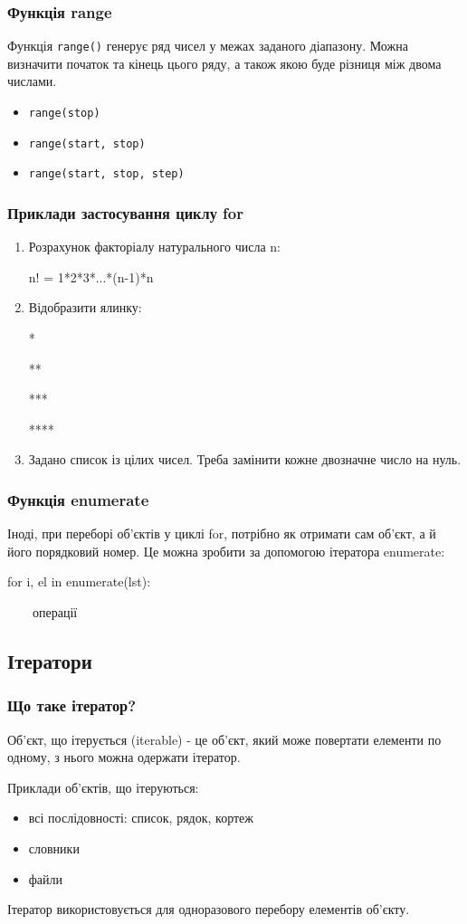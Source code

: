 \begin{frame}
\frametitle{Функція range}
Функція \texttt{range()} генерує ряд чисел у межах заданого діапазону. Можна визначити початок та кінець цього ряду, а також якою буде різниця між двома числами.

\begin{itemize}
  \item \texttt{range(stop)}
  \item \texttt{range(start, stop)}
  \item \texttt{range(start, stop, step)}
\end{itemize}
\end{frame}

\begin{frame}
\frametitle{Приклади застосування циклу for}
\begin{enumerate}
  \item 
  Розрахунок факторіалу натурального числа n:

\begin{center}
n! = 1*2*3*...*(n-1)*n
\end{center}
\item 
Відобразити ялинку:

*

**

***

****

\item 
Задано список із цілих чисел. Треба замінити кожне двозначне число на нуль.
\end{enumerate}
\end{frame}

\begin{frame}
\frametitle{Функція enumerate}
Іноді, при переборі об'єктів у циклі for, потрібно як отримати сам об'єкт, а й його порядковий номер. Це можна зробити за допомогою ітератора enumerate:

\huge{for i, el in enumerate(lst):

~~~~операції}
\end{frame}

\subsection{Ітератори} 
\begin{frame}
\frametitle{Що таке ітератор?}
Об'єкт, що ітерується (iterable) - це об'єкт, який може повертати елементи по одному, з нього можна одержати ітератор.

Приклади об'єктів, що ітеруються:

\begin{itemize}
  \item всі послідовності: список, рядок, кортеж
  \item словники
  \item файли 
\end{itemize}
    
Ітератор використовується для одноразового перебору елементів об'єкту.
\end{frame}

